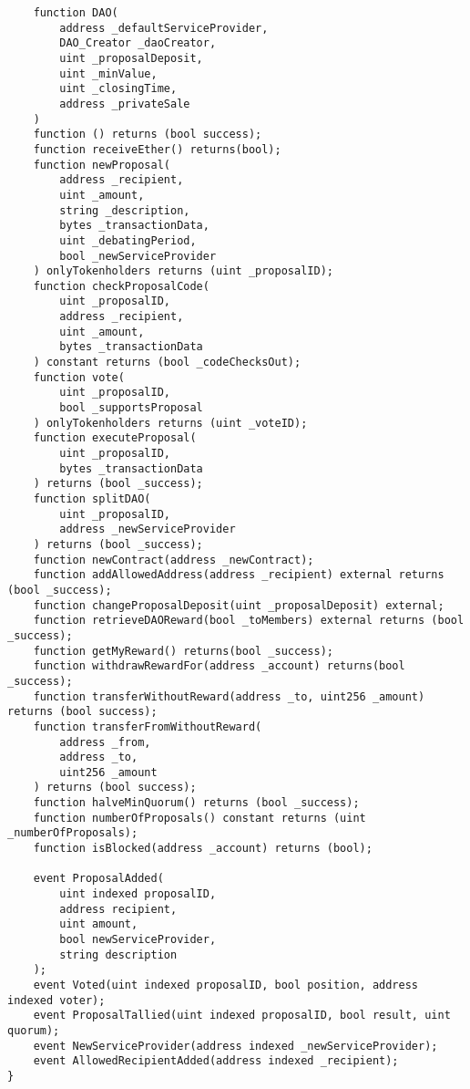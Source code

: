 \documentclass[9pt,oneside]{amsart}
\begin{document}
\begin{verbatim}
    function DAO(
        address _defaultServiceProvider,
        DAO_Creator _daoCreator,
        uint _proposalDeposit,
        uint _minValue,
        uint _closingTime,
        address _privateSale
    )
    function () returns (bool success);
    function receiveEther() returns(bool);
    function newProposal(
        address _recipient,
        uint _amount,
        string _description,
        bytes _transactionData,
        uint _debatingPeriod,
        bool _newServiceProvider
    ) onlyTokenholders returns (uint _proposalID);
    function checkProposalCode(
        uint _proposalID,
        address _recipient,
        uint _amount,
        bytes _transactionData
    ) constant returns (bool _codeChecksOut);
    function vote(
        uint _proposalID,
        bool _supportsProposal
    ) onlyTokenholders returns (uint _voteID);
    function executeProposal(
        uint _proposalID,
        bytes _transactionData
    ) returns (bool _success);
    function splitDAO(
        uint _proposalID,
        address _newServiceProvider
    ) returns (bool _success);
    function newContract(address _newContract);
    function addAllowedAddress(address _recipient) external returns (bool _success);
    function changeProposalDeposit(uint _proposalDeposit) external;
    function retrieveDAOReward(bool _toMembers) external returns (bool _success);
    function getMyReward() returns(bool _success);
    function withdrawRewardFor(address _account) returns(bool _success);
    function transferWithoutReward(address _to, uint256 _amount) returns (bool success);
    function transferFromWithoutReward(
        address _from,
        address _to,
        uint256 _amount
    ) returns (bool success);
    function halveMinQuorum() returns (bool _success);
    function numberOfProposals() constant returns (uint _numberOfProposals);
    function isBlocked(address _account) returns (bool);

    event ProposalAdded(
        uint indexed proposalID,
        address recipient,
        uint amount,
        bool newServiceProvider,
        string description
    );
    event Voted(uint indexed proposalID, bool position, address indexed voter);
    event ProposalTallied(uint indexed proposalID, bool result, uint quorum);
    event NewServiceProvider(address indexed _newServiceProvider);
    event AllowedRecipientAdded(address indexed _recipient);
}

\end{verbatim}
\end{document}
